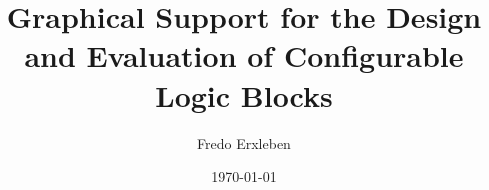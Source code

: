 \subject{
	Großer Beleg
}

\title{
	Graphical Support for the Design and Evaluation of Configurable Logic Blocks
}

\author{
	Fredo Erxleben
}

\date{
	\today
}

\newcommand{\supervisingprof}{
	Prof. Dr.-Ing. habil. Rainer G. Spallek
}

\newcommand{\supervisor}{
	Dr.-Ing. Thomas B. Preußer
}

\newcommand{\bornat}{
	30th\ April\ 1987
}

\newcommand{\bornin}{
	Blankenburg\,(Harz)
}

\newcommand{\matriculation}{
	33\,00\,664
}

